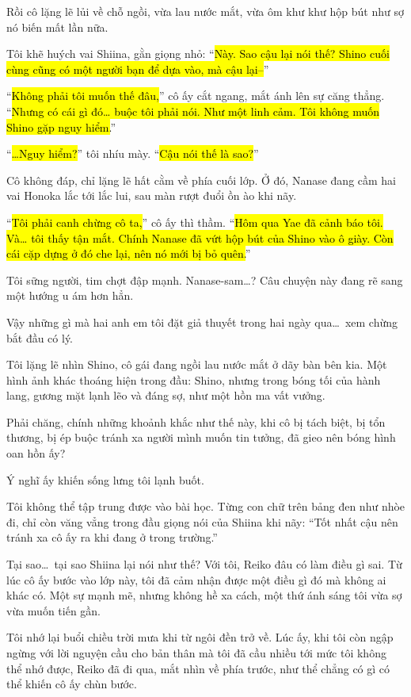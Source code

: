 \documentclass[../main.tex]{subfiles}
\begin{document}
Rồi cô lặng lẽ lủi về chỗ ngồi, vừa lau nước mắt, vừa ôm khư khư hộp bút như sợ nó biến mất lần nữa.

Tôi khẽ huých vai Shiina, gằn giọng nhỏ: ``\hl{Này. Sao cậu lại nói thế? Shino cuối cùng cũng có một người bạn để dựa vào, mà cậu lại--}''

``\hl{Không phải tôi muốn thế đâu,}'' cô ấy cắt ngang, mắt ánh lên sự căng thẳng. ``\hl{Nhưng có cái gì đó\dots{} buộc tôi phải nói. Như một linh cảm. Tôi không muốn Shino gặp nguy hiểm.}''

``\hl{\dots Nguy hiểm?}'' tôi nhíu mày. ``\hl{Cậu nói thế là sao?}''

Cô không đáp, chỉ lặng lẽ hất cằm về phía cuối lớp. Ở đó, Nanase đang cầm hai vai Honoka lắc tới lắc lui, sau màn rượt đuổi ồn ào khi nãy.

``\hl{Tôi phải canh chừng cô ta,}'' cô ấy thì thầm. ``\hl{Hôm qua Yae đã cảnh báo tôi. Và\dots{} tôi thấy tận mắt. Chính Nanase đã vứt hộp bút của Shino vào ô giày. Còn cái cặp dựng ở đó che lại, nên nó mới bị bỏ quên.}''

Tôi sững người, tim chợt đập mạnh. Nanase-sam\dots? Câu chuyện này đang rẽ sang một hướng u ám hơn hẳn.

Vậy những gì mà hai anh em tôi đặt giả thuyết trong hai ngày qua\dots\ xem chừng bắt đầu có lý.

Tôi lặng lẽ nhìn Shino, cô gái đang ngồi lau nước mắt ở dãy bàn bên kia. Một hình ảnh khác thoáng hiện trong đầu: Shino, nhưng trong bóng tối của hành lang, gương mặt lạnh lẽo và đáng sợ, như một hồn ma vất vưởng.

Phải chăng, chính những khoảnh khắc như thế này, khi cô bị tách biệt, bị tổn thương, bị ép buộc tránh xa người mình muốn tin tưởng, đã gieo nên bóng hình oan hồn ấy?

Ý nghĩ ấy khiến sống lưng tôi lạnh buốt.


Tôi không thể tập trung được vào bài học. Từng con chữ trên bảng đen như nhòe đi, chỉ còn văng vẳng trong đầu giọng nói của Shiina khi nãy: ``Tốt nhất cậu nên tránh xa cô ấy ra khi đang ở trong trường.''

Tại sao\dots\ tại sao Shiina lại nói như thế? Với tôi, Reiko đâu có làm điều gì sai. Từ lúc cô ấy bước vào lớp này, tôi đã cảm nhận được một điều gì đó mà không ai khác có. Một sự mạnh mẽ, nhưng không hề xa cách, một thứ ánh sáng tôi vừa sợ vừa muốn tiến gần.

Tôi nhớ lại buổi chiều trời mưa khi từ ngôi đền trở về. Lúc ấy, khi tôi còn ngập ngừng với lời nguyện cầu cho bản thân mà tôi đã cầu nhiều tới mức tôi không thể nhớ được, Reiko đã đi qua, mắt nhìn về phía trước, như thể chẳng có gì có thể khiến cô ấy chùn bước.
\end{document}
